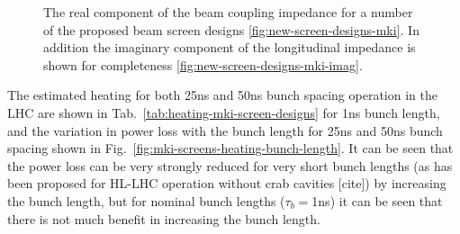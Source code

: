 \begin{figure}
\begin{center}
\end{center}
\caption{The real component of the beam coupling impedance for a number of the proposed beam screen designs \ref{fig:new-screen-designs-mki}. In addition the imaginary component of the longitudinal impedance is shown for completeness \ref{fig:new-screen-designs-mki-imag}.}
\end{figure}

The estimated heating for both 25ns and 50ns bunch spacing operation in the LHC are shown in Tab.~\ref{tab:heating-mki-screen-designs} for 1ns bunch length, and the variation in power loss with the bunch length for 25ns and 50ns bunch spacing shown in Fig.~\ref{fig:mki-screens-heating-bunch-length}. It can be seen that the power loss can be very strongly reduced for very short bunch lengths (as has been proposed for HL-LHC operation without crab cavities [cite]) by increasing the bunch length, but for nominal bunch lengths ($\tau_{b}=$1ns) it can be seen that there is not much benefit in increasing the bunch length.


